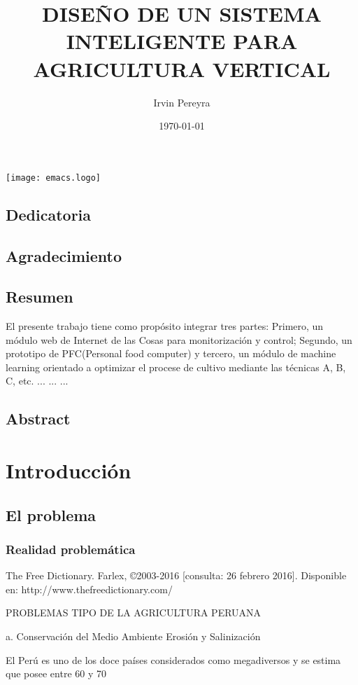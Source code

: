 \documentclass{report}
\title{DISEÑO DE UN SISTEMA INTELIGENTE PARA AGRICULTURA VERTICAL}
\author{Irvin Pereyra}
\date{\today}
\begin{document}
\maketitle
\texttt{[image: emacs.logo]}
\section{Dedicatoria}
\section{Agradecimiento}
\tableofcontents
\newpage
{}
\section{Resumen}
El presente trabajo tiene como propósito integrar tres partes: Primero, un
módulo web de Internet de las Cosas para monitorización y control; Segundo, un prototipo de PFC(Personal food
computer) y tercero, un módulo de machine learning orientado a optimizar el procese
de cultivo mediante las técnicas A, B, C, etc.
...
...
...
\section{Abstract}

\chapter{Introducción}

\section{El problema}

\subsection{Realidad problemática}


The Free Dictionary. Farlex, ©2003-2016 [consulta: 26 febrero 2016]. Disponible en: http://www.thefreedictionary.com/

PROBLEMAS TIPO DE LA AGRICULTURA PERUANA

a. Conservación del Medio Ambiente Erosión y Salinización

El Perú es uno de los doce países considerados como megadiversos y se estima que posee entre 60 y 70%
\end{document}
